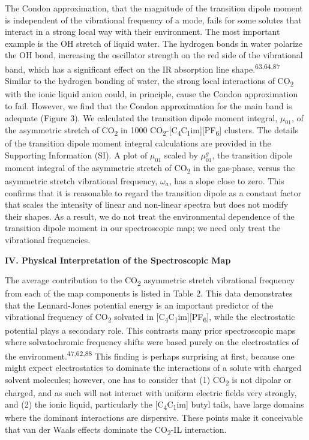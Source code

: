 \documentclass[]{article}
\begin{document}
The Condon approximation, that the magnitude of the transition dipole moment is independent of the vibrational frequency of a mode, fails for some solutes that interact in a strong local way with their environment.  The most important example is the OH stretch of liquid water. The hydrogen bonds in water polarize the OH bond, increasing the oscillator strength on the red side of the vibrational band, which has a significant effect on the IR absorption line shape.\textsuperscript{63,64,87} Similar to the hydrogen bonding of water, the strong local interactions of CO\textsubscript{2} with the ionic liquid anion could, in principle, cause the Condon approximation to fail. However, we find that the Condon approximation for the main band is adequate (Figure 3). We calculated the transition dipole moment integral, \(\mu_{01}\), of the asymmetric stretch of CO\textsubscript{2} in 1000 CO\textsubscript{2}-{[}C\textsubscript{4}C\textsubscript{1}im{]}{[}PF\textsubscript{6}{]} clusters. The details of the transition dipole moment integral calculations are provided in the Supporting Information (SI). A plot of \(\mu_{01}\) scaled by \(\mu_{01}^{g}\), the transition dipole moment integral of the asymmetric stretch of CO\textsubscript{2} in the gas-phase, versus the asymmetric stretch vibrational frequency, \(\omega_{a}\), has a slope close to zero. This confirms that it is reasonable to regard the transition dipole as a constant factor that scales the intensity of linear and non-linear spectra but does not modify their shapes. As a result, we do not treat the environmental dependence of the transition dipole moment in our spectroscopic map; we need only treat the vibrational frequencies.

\textbf{IV. Physical Interpretation of the Spectroscopic Map}

The average contribution to the CO\textsubscript{2} asymmetric stretch vibrational frequency from each of the map components is listed in Table 2. This data demonstrates that the Lennard-Jones potential energy is an important predictor of the vibrational frequency of CO\textsubscript{2} solvated in {[}C\textsubscript{4}C\textsubscript{1}im{]}{[}PF\textsubscript{6}{]}, while the electrostatic potential plays a secondary role. This contrasts many prior spectroscopic maps where solvatochromic frequency shifts were based purely on the electrostatics of the environment.\textsuperscript{47,62,88} This finding is perhaps surprising at first, because one might expect electrostatics to dominate the interactions of a solute with charged solvent molecules; however, one has to consider that (1) CO\textsubscript{2} is not dipolar or charged, and as such will not interact with uniform electric fields very strongly, and (2) the ionic liquid, particularly the {[}C\textsubscript{4}C\textsubscript{1}im{]} butyl tails, have large domains where the dominant interactions are dispersive. These points make it conceivable that van der Waals effects dominate the CO\textsubscript{2}-IL interaction.
\end{document}
